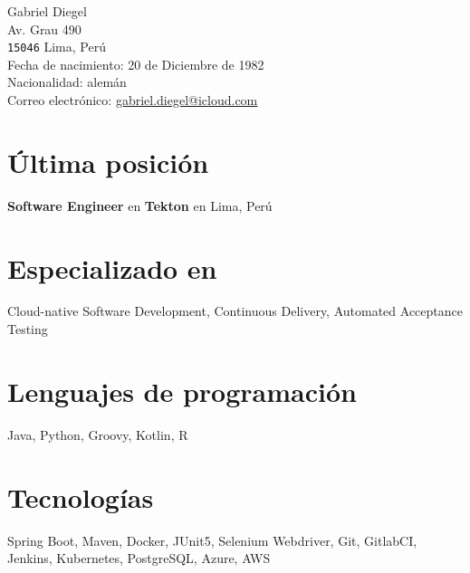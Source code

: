 \documentclass[9pt, a4paper]{extarticle}
\begin{document}
{\LARGE Gabriel Diegel}\\[1cm]
Av. Grau 490\\
\texttt{15046} Lima, Perú\\[.2cm]
Fecha de nacimiento: 20 de Diciembre de 1982\\
Nacionalidad: alemán\\[.2cm]
Correo electrónico: \href{mailto:gabriel.diegel@icloud.com}{gabriel.diegel@icloud.com}\\

\section*{Última posición}
{\bf Software Engineer} en {\bf Tekton} en Lima, Perú

\section*{Especializado en}
Cloud-native Software Development, Continuous Delivery, Automated Acceptance Testing

\section*{Lenguajes de programación}
Java, Python, Groovy, Kotlin, R

\section*{Tecnologías}
Spring Boot, Maven, Docker, JUnit5, Selenium Webdriver, Git, GitlabCI, Jenkins, Kubernetes, PostgreSQL, Azure, AWS
\end{document}
